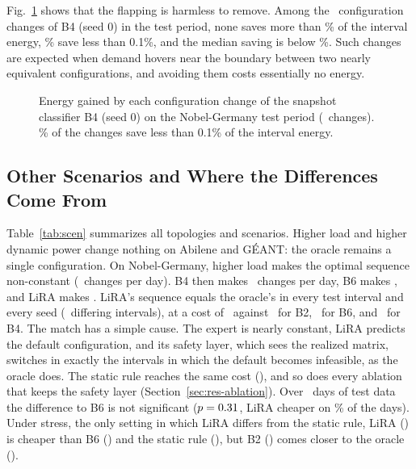 \documentclass[preprint,12pt]{elsarticle}
\begin{document}
Fig.~\ref{fig:gain} shows that the flapping is harmless to remove. Among the \gainChanges\ configuration changes of B4 (seed 0) in the test period, none saves more than \gainMax\% of the interval energy, \gainTenthShare\% save less than 0.1\%, and the median saving is below \gainMedianBelow\%. Such changes are expected when demand hovers near the boundary between two nearly equivalent configurations, and avoiding them costs essentially no energy.

\begin{figure}[t]
\centering
{}
\caption{Energy gained by each configuration change of the snapshot classifier B4 (seed 0) on the Nobel-Germany test period (\gainChanges\ changes). \gainTenthShare\% of the changes save less than 0.1\% of the interval energy.}
\label{fig:gain}
\end{figure}

\subsection{Other Scenarios and Where the Differences Come From}

Table~\ref{tab:scen} summarizes all topologies and scenarios. Higher load and higher dynamic power change nothing on Abilene and G\'{E}ANT: the oracle remains a single configuration. On Nobel-Germany, higher load makes the optimal sequence non-constant (\nobhlOchg\ changes per day). B4 then makes \nobhlBFourchg\ changes per day, B6 makes \nobhlBsixChg, and LiRA makes \nobhlLiRAchg. LiRA's sequence equals the oracle's in every test interval and every seed (\hlLiraOracleDiff\ differing intervals), at a cost of \nobJLiRAhl\ against \nobJBtwohl\ for B2, \nobJBsixhl\ for B6, and \nobhlJBFour\ for B4. The match has a simple cause. The expert is nearly constant, LiRA predicts the default configuration, and its safety layer, which sees the realized matrix, switches in exactly the intervals in which the default becomes infeasible, as the oracle does. The static rule reaches the same cost (\staticJhl), and so does every ablation that keeps the safety layer (Section~\ref{sec:res-ablation}). Over \nobTestDays\ days of test data the difference to B6 is not significant ($p=0.31$, LiRA cheaper on \effBsixDayshl\% of the days). Under stress, the only setting in which LiRA differs from the static rule, LiRA (\nobJLiRAst) is cheaper than B6 (\nobJBsixst) and the static rule (\staticJst), but B2 (\nobJBtwost) comes closer to the oracle (\nobJOst).
\end{document}
